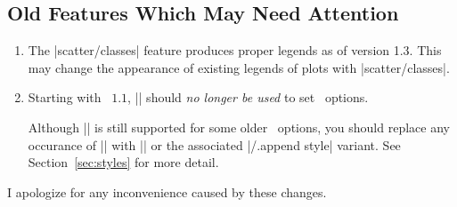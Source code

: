 \subsection{Old Features Which May Need Attention}
\begin{enumerate}
	\item The |scatter/classes| feature produces proper legends as of version 1.3. This may change the appearance of existing legends of plots with |scatter/classes|.

	\item Starting with \PGFPlots\ $1.1$, |\tikzstyle| should \emph{no longer be used} to set \PGFPlots\ options.
	
	Although |\tikzstyle| is still supported for some older \PGFPlots\ options, you should replace any occurance of |\tikzstyle| with || or the associated |/.append style| variant. See Section~\ref{sec:styles} for more detail.
\end{enumerate}
I apologize for any inconvenience caused by these changes.


